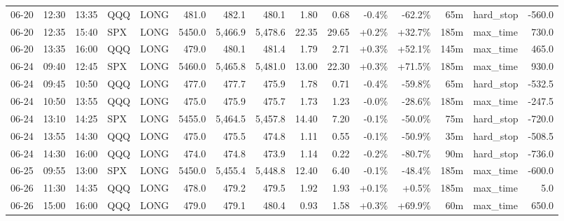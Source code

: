 \documentclass[11pt,a4paper,twoside]{article}
\begin{document}
\begin{landscape}
\begin{center}
\begin{longtable}{>{\color{txtmain}}l l l l l r r r r r r r r >{\color{txtmain}}l r}
06-20 & 12:30 & 13:35 & QQQ & LONG & 481.0 & 482.1 & 480.1 & 1.80 & 0.68 & \textcolor{lossred}{-0.4\%} & \textcolor{lossred}{-62.2\%} & 65m & hard\_stop & \textcolor{lossred}{-560.0} \\
06-20 & 12:35 & 15:40 & SPX & LONG & 5450.0 & 5,466.9 & 5,478.6 & 22.35 & 29.65 & \textcolor{wingreen}{+0.2\%} & \textcolor{wingreen}{+32.7\%} & 185m & max\_time & \textcolor{wingreen}{730.0} \\
06-20 & 13:35 & 16:00 & QQQ & LONG & 479.0 & 480.1 & 481.4 & 1.79 & 2.71 & \textcolor{wingreen}{+0.3\%} & \textcolor{wingreen}{+52.1\%} & 145m & max\_time & \textcolor{wingreen}{465.0} \\
06-24 & 09:40 & 12:45 & SPX & LONG & 5460.0 & 5,465.8 & 5,481.0 & 13.00 & 22.30 & \textcolor{wingreen}{+0.3\%} & \textcolor{wingreen}{+71.5\%} & 185m & max\_time & \textcolor{wingreen}{930.0} \\
06-24 & 09:45 & 10:50 & QQQ & LONG & 477.0 & 477.7 & 475.9 & 1.78 & 0.71 & \textcolor{lossred}{-0.4\%} & \textcolor{lossred}{-59.8\%} & 65m & hard\_stop & \textcolor{lossred}{-532.5} \\
06-24 & 10:50 & 13:55 & QQQ & LONG & 475.0 & 475.9 & 475.7 & 1.73 & 1.23 & \textcolor{lossred}{-0.0\%} & \textcolor{lossred}{-28.6\%} & 185m & max\_time & \textcolor{lossred}{-247.5} \\
06-24 & 13:10 & 14:25 & SPX & LONG & 5455.0 & 5,464.5 & 5,457.8 & 14.40 & 7.20 & \textcolor{lossred}{-0.1\%} & \textcolor{lossred}{-50.0\%} & 75m & hard\_stop & \textcolor{lossred}{-720.0} \\
06-24 & 13:55 & 14:30 & QQQ & LONG & 475.0 & 475.5 & 474.8 & 1.11 & 0.55 & \textcolor{lossred}{-0.1\%} & \textcolor{lossred}{-50.9\%} & 35m & hard\_stop & \textcolor{lossred}{-508.5} \\
06-24 & 14:30 & 16:00 & QQQ & LONG & 474.0 & 474.8 & 473.9 & 1.14 & 0.22 & \textcolor{lossred}{-0.2\%} & \textcolor{lossred}{-80.7\%} & 90m & hard\_stop & \textcolor{lossred}{-736.0} \\
06-25 & 09:55 & 13:00 & SPX & LONG & 5450.0 & 5,455.4 & 5,448.8 & 12.40 & 6.40 & \textcolor{lossred}{-0.1\%} & \textcolor{lossred}{-48.4\%} & 185m & max\_time & \textcolor{lossred}{-600.0} \\
06-26 & 11:30 & 14:35 & QQQ & LONG & 478.0 & 479.2 & 479.5 & 1.92 & 1.93 & \textcolor{wingreen}{+0.1\%} & \textcolor{wingreen}{+0.5\%} & 185m & max\_time & \textcolor{wingreen}{5.0} \\
06-26 & 15:00 & 16:00 & QQQ & LONG & 479.0 & 479.1 & 480.4 & 0.93 & 1.58 & \textcolor{wingreen}{+0.3\%} & \textcolor{wingreen}{+69.9\%} & 60m & max\_time & \textcolor{wingreen}{650.0} \\

\end{longtable}
\end{center}
\end{landscape}
\end{document}
